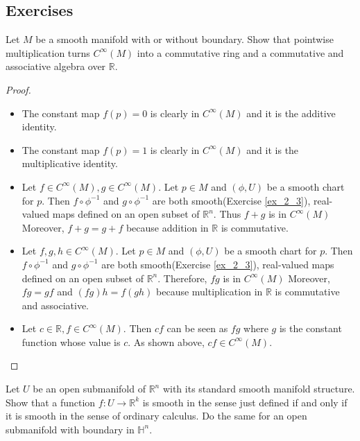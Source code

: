 \subsection{Exercises}
\begin{customexer}{2.1}
  Let $M$ be a smooth manifold with or without boundary.
  Show that pointwise multiplication turns $C^{\infty}(M)$ into a commutative ring and a commutative and associative algebra over $\mathbb{R}$.
\end{customexer}

\begin{proof}
  $ $
  \begin{itemize}
    \item
      The constant map $f(p) = 0$ is clearly in $C^{\infty}(M)$ and it is the additive identity.
    \item
      The constant map $f(p) = 1$ is clearly in $C^{\infty}(M)$ and it is the multiplicative identity.
    \item
      Let $f \in C^{\infty}(M), g \in C^{\infty}(M)$.
      Let $p \in M$ and $(\phi, U)$ be a smooth chart for $p$.
      Then $f \circ \phi^{-1}$ and $g \circ \phi^{-1}$ are both smooth(Exercise \ref{ex_2_3}), real-valued maps defined on an open subset of $\mathbb{R}^n$.
      Thus $f + g$ is in $C^{\infty}(M)$ 
      Moreover, $f + g = g + f$ because addition in $\mathbb{R}$ is commutative.
    \item
      Let $f, g, h \in C^{\infty}(M)$.
      Let $p \in M$ and $(\phi, U)$ be a smooth chart for $p$.
      Then $f \circ \phi^{-1}$ and $g \circ \phi^{-1}$ are both smooth(Exercise \ref{ex_2_3}), real-valued maps defined on an open subset of $\mathbb{R}^n$.
      Therefore, $fg$ is in $C^{\infty}(M)$
      Moreover, $fg = gf$ and $(fg)h = f(gh)$ because multiplication in $\mathbb{R}$ is commutative and associative.
    \item
      Let $c \in \mathbb{R}, f \in C^{\infty}(M)$.
      Then $cf$ can be seen as $fg$ where $g$ is the constant function whose value is $c$.
      As shown above, $cf \in C^{\infty}(M)$.
  \end{itemize}
\end{proof}

\begin{customexer}{2.2}
  Let $U$ be an open submanifold of $\mathbb{R}^n$ with its standard smooth manifold structure.
  Show that a function $f: U \rightarrow \mathbb{R}^k$ is smooth in the sense just defined if and only if it is smooth in the sense of ordinary calculus.
  Do the same for an open submanifold with boundary in $\mathbb{H}^n$.
\end{customexer}

